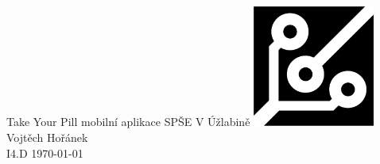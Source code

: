 \documentclass[../TakeYourPill.tex]{subfiles}
\begin{document}
\begin{titlepage}
    \large
    \centering
    \vspace*{\fill}
    {\LARGE Take Your Pill}
    \vskip 1mm
    {\Large mobilní aplikace}
    \vskip1cm
    {\large SPŠE V Úžlabině}
    \vskip 20pt
    \includegraphics[width=4cm]{uzlabina.png}
    \vskip 40pt
    Vojtěch Hořánek \\
    I4.D
    \vskip 15pt
    \today
    \vfill
\end{titlepage}
\end{document}
